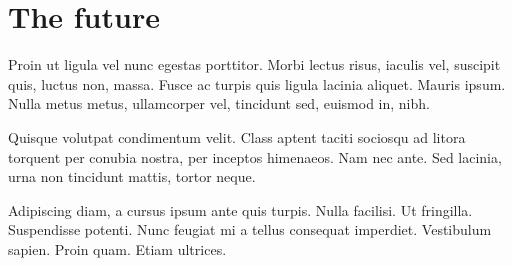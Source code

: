 
\chapter*{The future}
\label{chap:future}
Proin ut ligula vel nunc egestas porttitor. Morbi lectus risus, iaculis vel, suscipit quis, luctus non, massa. Fusce ac turpis quis ligula lacinia aliquet. Mauris ipsum. Nulla metus metus, ullamcorper vel, tincidunt sed, euismod in, nibh.

Quisque volutpat condimentum velit. Class aptent taciti sociosqu ad litora torquent per conubia nostra, per inceptos himenaeos. Nam nec ante. Sed lacinia, urna non tincidunt mattis, tortor neque.

Adipiscing diam, a cursus ipsum ante quis turpis. Nulla facilisi. Ut fringilla. Suspendisse potenti. Nunc feugiat mi a tellus consequat imperdiet. Vestibulum sapien. Proin quam. Etiam ultrices.

